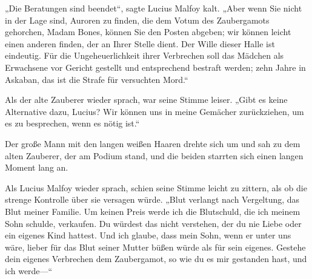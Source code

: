 „Die Beratungen sind beendet“, sagte Lucius Malfoy kalt. „Aber wenn Sie nicht in der Lage sind, Auroren zu finden, die dem Votum des Zaubergamots gehorchen, Madam Bones, können Sie den Posten abgeben; wir können leicht einen anderen finden, der an Ihrer Stelle dient. Der Wille dieser Halle ist eindeutig. Für die Ungeheuerlichkeit ihrer Verbrechen soll das Mädchen als Erwachsene vor Gericht gestellt und entsprechend bestraft werden; zehn Jahre in Askaban, das ist die Strafe für versuchten Mord.“

Als der alte Zauberer wieder sprach, war seine Stimme leiser.
„Gibt es keine Alternative dazu, Lucius? Wir können uns in meine Gemächer zurückziehen, um es zu besprechen, wenn es nötig ist.“

Der große Mann mit den langen weißen Haaren drehte sich um und sah zu dem alten Zauberer, der am Podium stand, und die beiden starrten sich einen langen Moment lang an.

Als Lucius Malfoy wieder sprach, schien seine Stimme leicht zu zittern, als ob die strenge Kontrolle über sie versagen würde.
„Blut verlangt nach Vergeltung, das Blut meiner Familie. Um keinen Preis werde ich die Blutschuld, die ich meinem Sohn schulde, verkaufen. Du würdest das nicht verstehen, der du nie Liebe oder ein eigenes Kind hattest. Und ich glaube, dass mein Sohn, wenn er unter uns wäre, lieber für das Blut seiner Mutter büßen würde als für sein eigenes. Gestehe dein eigenes Verbrechen dem Zaubergamot, so wie du es mir gestanden hast, und ich werde—“

